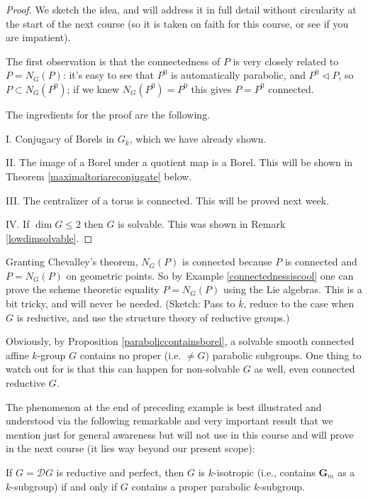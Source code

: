 \documentclass[10pt]{article}
\renewcommand{\(}{\left(}
\renewcommand{\)}{\right)}
\numberwithin{thm}{subsection}
\begin{document}
\begin{proof}
We sketch the idea, and will address
it in full detail without circularity at the start of the next course (so it is taken on faith
for this course, or see \cite[Thm.\,11.16]{borel} if you are impatient). 

The first observation is that the connectedness of $P$ is very closely
related to $P=N_G(P)$:
it's easy to see that $P^0$ is automatically parabolic,
and $P^0\vartriangleleft P$,
so $P\subset N_G(P^0)$;
if we knew $N_G(P^0)=P^0$ this gives $P=P^0$ connected.

The ingredients for the proof are the following.

I. Conjugacy of Borels in $G_{\overline{k}}$, which we have already shown.

II. The image of a Borel under a quotient map is a Borel.
This will be shown in Theorem \ref{maximaltoriareconjugate} below.

III. The centralizer of a torus is connected. 
This will be proved next week.

IV. If $\dim  G\leq 2$ then $G$ is solvable.
This was shown in Remark \ref{lowdimsolvable}.
\end{proof}
\begin{rem}\label{}
Granting Chevalley's theorem, $N_G(P)$ is connected 
because $P$ is connected and $P=N_G(P)$ on geometric points.
So by Example \ref{connectednessiscool}
one can prove the  scheme theoretic equality $P=N_G(P)$
using the Lie algebras.
This is a bit tricky, and will never be needed. (Sketch: Pass to $\overline{k}$,
reduce to the case when $G$ is reductive,
and use the structure theory of reductive groups.)
\end{rem}
\begin{ex}\label{}
Obviously, by Proposition \ref{paraboliccontainsborel},
a solvable smooth connected affine $k$-group $G$
contains no proper (i.e. $\neq G$) parabolic subgroups.
One thing to watch out for is that this can happen for non-solvable $G$
as well, even connected reductive $G$.  
\end{ex}

The phenomenon at the end of preceding example is best illustrated and understood via
the following remarkable and very important result that we mention just for general awareness but 
will not use in this course and will prove in the next course (it lies
way beyond our present scope):

\begin{prop}\label{}
If $G=\mathscr{D}G$ is reductive and perfect,
then $G$ is $k$-isotropic (i.e., contains $\mathbf{G}_m$ as a $k$-subgroup)
if and only if $G$ contains a proper parabolic $k$-subgroup.
\end{prop}
\end{document}
